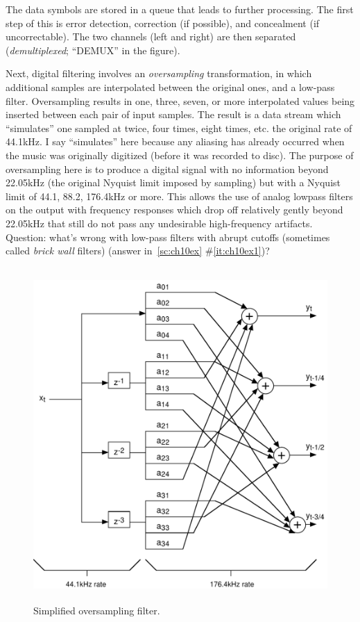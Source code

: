 The data symbols are stored in a queue that leads to further
processing.  The first step of this is error detection, correction (if
possible), and concealment (if uncorrectable). The two channels (left
and right) are then separated (\emph{demultiplexed}; ``DEMUX'' in the
figure). 

Next, digital filtering involves an \emph{oversampling}
transformation, in which additional samples are interpolated between
the original ones, and a low-pass filter. Oversampling results in one,
three, seven, or more interpolated values being inserted between each
pair of input samples. The result is a data stream which ``simulates''
one sampled at twice, four times, eight times, etc. the original rate
of 44.1kHz. I say ``simulates'' here because any aliasing has already
occurred when the music was originally digitized (before it was
recorded to disc). The purpose of oversampling here is to produce a
digital signal with no information beyond 22.05kHz (the original Nyquist
limit imposed by sampling) but with a Nyquist limit of 44.1, 88.2,
176.4kHz or more. This allows the use of analog lowpass filters on the
output with frequency responses which drop off relatively gently
beyond 22.05kHz that still do not pass any undesirable high-frequency
artifacts.  Question: what's wrong with low-pass filters with abrupt
cutoffs (sometimes called \emph{brick wall} filters) (answer
in~\ref{sc:ch10ex}
\#\ref{it:ch10ex1})?

\begin{figure}
\centerline{\includegraphics[height=5in]{ch-rev/fig10-3}}
\caption{Simplified oversampling filter.\label{fg:oversampling}}
\end{figure}

